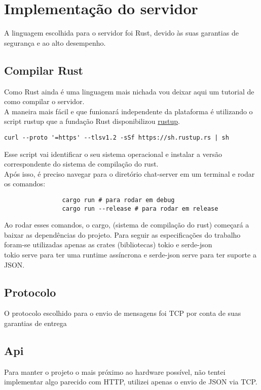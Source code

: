 \documentclass{article}
\begin{document}
\section{Implementação do servidor}
{
    A linguagem escolhida para o servidor foi Rust, devido às suas garantias de segurança e ao alto desempenho.
    \newpage
    \subsection{Compilar Rust}
    {
        Como Rust ainda é uma linguagem mais nichada vou deixar aqui um tutorial de como compilar o servidor.\\
        A maneira mais fácil e que funionará independente da plataforma é utilizando o script rustup que a fundação Rust disponibilizou
        \href{https://rustup.rs/}{rustup}.
        \begin{verbatim}
curl --proto '=https' --tlsv1.2 -sSf https://sh.rustup.rs | sh
        \end{verbatim}
        Esse script vai identificar o seu sistema operacional e instalar a versão correspondente do sistema de compilação do rust. \\
        Após isso, é preciso navegar para o diretório chat-server em um terminal e rodar os comandos: \\
        \begin{center}
            \begin{verbatim}
                cargo run # para rodar em debug 
                cargo run --release # para rodar em release                            
            \end{verbatim}
        \end{center}
        Ao rodar esses comandos, o cargo, (sistema de compilação do rust) começará a baixar as dependências do projeto.
        Para seguir as especificações do trabalho foram-se utilizadas apenas as crates (bibliotecas) tokio e serde-json \\
        tokio serve para ter uma runtime assíncrona e serde-json serve para ter suporte a JSON.
    }    

    \subsection{Protocolo}
    {
        O protocolo escolhido para o envio de mensagens foi TCP por conta de suas garantias de entrega
    }
    \subsection{Api}
    {
        Para manter o projeto o mais próximo ao hardware possível, não tentei implementar algo parecido com HTTP, utilizei apenas o envio de JSON via TCP.
}}
\end{document}
